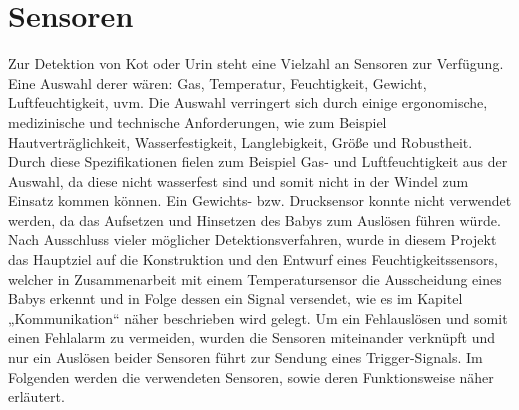 \section{Sensoren}
\label{sec:sensor}

Zur Detektion von Kot oder Urin steht eine Vielzahl an Sensoren zur
Verfügung. Eine Auswahl derer wären: Gas, Temperatur, Feuchtigkeit,
Gewicht, Luftfeuchtigkeit, uvm. Die Auswahl verringert sich durch
einige ergonomische, medizinische und technische Anforderungen, wie
zum Beispiel Hautverträglichkeit, Wasserfestigkeit, Langlebigkeit,
Größe und Robustheit. Durch diese Spezifikationen fielen zum
Beispiel Gas- und Luftfeuchtigkeit aus der Auswahl, da diese nicht
wasserfest sind und somit nicht in der Windel zum Einsatz kommen
können. Ein Gewichts- bzw. Drucksensor konnte nicht verwendet werden,
da das Aufsetzen und Hinsetzen des Babys zum Auslösen führen würde.
Nach Ausschluss vieler möglicher Detektionsverfahren, wurde in diesem
Projekt das Hauptziel auf die Konstruktion und den Entwurf eines
Feuchtigkeitssensors, welcher in Zusammenarbeit mit einem
Temperatursensor die Ausscheidung eines Babys erkennt und in Folge
dessen ein Signal versendet, wie es im Kapitel „Kommunikation“ näher
beschrieben wird gelegt. Um ein Fehlauslösen und somit einen Fehlalarm
zu vermeiden, wurden die Sensoren miteinander verknüpft und nur ein
Auslösen beider Sensoren führt zur Sendung eines Trigger-Signals.
Im Folgenden werden die verwendeten Sensoren, sowie deren
Funktionsweise näher erläutert.


